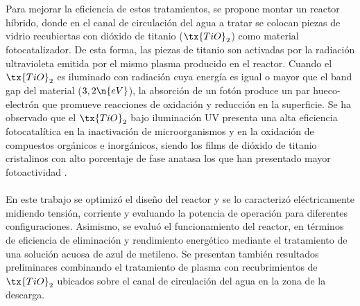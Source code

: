 Para mejorar la eficiencia de estos tratamientos, se propone montar un reactor híbrido, donde en el canal de circulación del agua a tratar se colocan piezas de vidrio recubiertas con dióxido de titanio ($\tx{TiO}_2$) como material fotocatalizador. De esta forma, las piezas de titanio son activadas por la radiación ultravioleta emitida por el mismo plasma producido en el reactor. Cuando el $\tx{TiO}_2$ es iluminado con radiación cuya energía es igual o mayor que el band gap del material ($3,2 \n{eV}$), la absorción de un fotón produce un par hueco-electrón que promueve reacciones de oxidación y reducción en la superficie. Se ha observado que el $\tx{TiO}_2$ bajo iluminación UV presenta una alta eficiencia fotocatalítica en la inactivación de microorganismos y en la oxidación de compuestos orgánicos e inorgánicos, siendo los films de dióxido de titanio cristalinos con alto porcentaje de fase anatasa los que han presentado mayor fotoactividad . \\\\
En este trabajo se optimizó el diseño del reactor y se lo caracterizó eléctricamente midiendo tensión, corriente y evaluando la potencia de operación para diferentes configuraciones. Asimismo, se evaluó el funcionamiento del reactor, en términos de eficiencia de eliminación y rendimiento energético mediante el tratamiento de una solución acuosa de azul de metileno. Se presentan también resultados preliminares combinando el tratamiento de plasma con recubrimientos de $\tx{TiO}_2$ ubicados sobre el canal de circulación del agua en la zona de la descarga.
